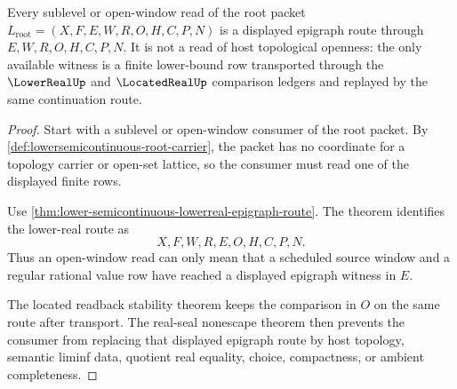 \begin{theorem}
\label{thm:lowersemicontinuous-open-sublevel-route}
Every sublevel or open-window read of the root packet
$L_{\mathrm{root}}=(X,F,E,W,R,O,H,C,P,N)$ is a displayed epigraph route through
$E,W,R,O,H,C,P,N$. It is not a read of host topological openness: the only
available witness is a finite lower-bound row transported through the
$\LowerRealUp$ and $\LocatedRealUp$ comparison ledgers and replayed by the same
continuation route.
\end{theorem}
\begin{proof}
Start with a sublevel or open-window consumer of the root packet. By
\autoref{def:lowersemicontinuous-root-carrier}, the packet has no coordinate
for a topology carrier or open-set lattice, so the consumer must read one of
the displayed finite rows.

Use \autoref{thm:lower-semicontinuous-lowerreal-epigraph-route}. The theorem
identifies the lower-real route as
$$
X,F,W,R,E,O,H,C,P,N .
$$
Thus an open-window read can only mean that a scheduled source window and a
regular rational value row have reached a displayed epigraph witness in $E$.

The located readback stability theorem keeps the comparison in $O$ on the same
route after transport. The real-seal nonescape theorem then prevents the
consumer from replacing that displayed epigraph route by host topology,
semantic liminf data, quotient real equality, choice, compactness, or ambient
completeness.
\end{proof}

